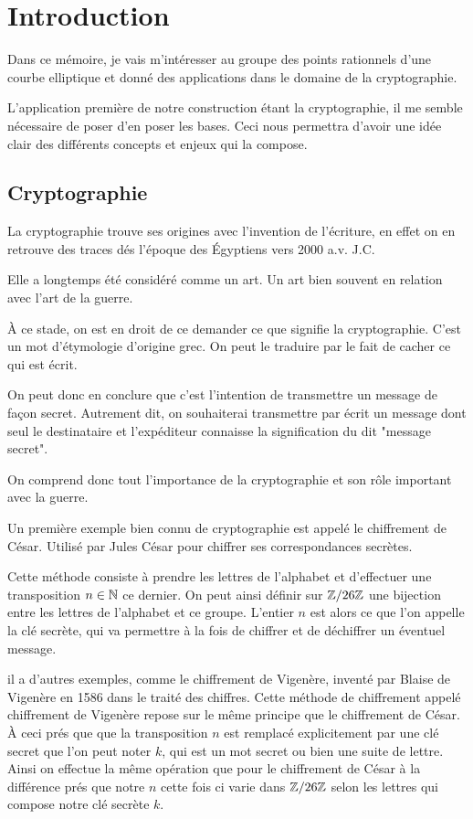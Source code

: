 \chapter{Introduction}

Dans ce mémoire, je vais m'intéresser au groupe des points rationnels d'une courbe elliptique
et donné des applications dans le
domaine de la cryptographie.

L'application première de notre construction étant la cryptographie, il me semble nécessaire de
poser d'en poser les bases. Ceci nous permettra d'avoir une idée clair
des différents concepts et enjeux qui la compose.

\section{Cryptographie}

La cryptographie trouve ses origines avec l'invention de l'écriture, en effet on en
retrouve des traces dés l'époque des Égyptiens vers 2000 a.v. J.C.

Elle a longtemps été considéré comme un art. Un art bien souvent en relation avec l'art de
la guerre.

À ce stade, on est en droit de ce demander ce que signifie la cryptographie. C'est un mot
d'étymologie d'origine grec. On peut le traduire par le fait de cacher ce qui est écrit.

On peut donc en conclure que c'est l'intention de transmettre un message de façon secret.
Autrement dit, on souhaiterai transmettre par écrit un message dont seul le destinataire
et l'expéditeur connaisse la signification du dit "message secret". 

On comprend donc tout l'importance de la cryptographie et son rôle important avec la
guerre.

Un première exemple bien connu de cryptographie est appelé le chiffrement de César. Utilisé par
Jules César pour chiffrer ses correspondances secrètes.

Cette méthode consiste à
prendre les lettres de l'alphabet et d'effectuer une transposition $n \in \mathbb{N}$ ce
dernier. On peut
ainsi définir sur $\mathbb{Z} / 26\mathbb{Z}$ une bijection entre les lettres de l'alphabet et ce groupe.
L'entier $n$ est alors ce que l'on appelle la clé secrète, qui va permettre à la fois de
chiffrer et de déchiffrer un éventuel message.

il a d'autres exemples, comme le chiffrement de Vigenère, inventé par Blaise de Vigenère en
1586 dans le traité des chiffres. Cette méthode de chiffrement appelé chiffrement de Vigenère repose sur le même principe que
le chiffrement de César. À ceci prés que que la transposition $n$ est remplacé explicitement
par une clé secret que l'on peut noter $k$, qui est un mot secret ou bien une suite de lettre.
Ainsi on effectue la même opération que pour le chiffrement de César à la différence prés que
notre $n$ cette fois ci varie dans $\mathbb{Z} / 26\mathbb{Z}$ selon les lettres qui compose notre clé secrète $k$.

